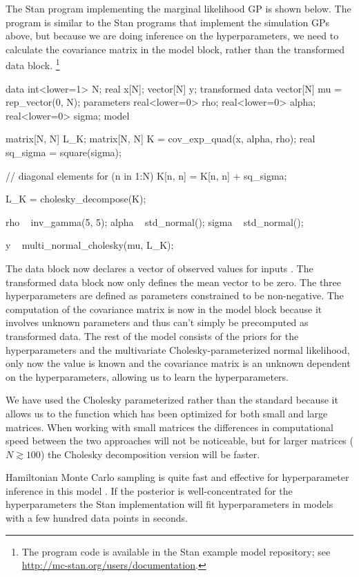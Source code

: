 The Stan program implementing the marginal likelihood GP is shown below. The
program is similar to the Stan programs that implement the simulation GPs
above, but because we are doing inference on the hyperparameters, we need to
calculate the covariance matrix  in the model block, rather than
the transformed data block.
%
\footnote{The program code is available in the Stan example model repository;
see \url{http://mc-stan.org/users/documentation}.}

%
\begin{stancode}
data {
  int<lower=1> N;
  real x[N];
  vector[N] y;
}
transformed data {
  vector[N] mu = rep_vector(0, N);
}
parameters {
  real<lower=0> rho;
  real<lower=0> alpha;
  real<lower=0> sigma;
}
model {
  matrix[N, N] L_K;
  matrix[N, N] K = cov_exp_quad(x, alpha, rho);
  real sq_sigma = square(sigma);

  // diagonal elements
  for (n in 1:N)
    K[n, n] = K[n, n] + sq_sigma;

  L_K = cholesky_decompose(K);

  rho ~ inv_gamma(5, 5);
  alpha ~ std_normal();
  sigma ~ std_normal();

  y ~ multi_normal_cholesky(mu, L_K);
}
\end{stancode}
%
The data block now declares a vector  of observed values 
for inputs .  The transformed data block now only defines the mean
vector to be zero.  The three hyperparameters are defined as parameters
constrained to be non-negative.  The computation of the covariance matrix
 is now in the model block because it involves unknown parameters and
thus can't simply be precomputed as transformed data.  The rest of the model
consists of the priors for the hyperparameters and the multivariate
Cholesky-parameterized normal likelihood, only now the value  is known
and the covariance matrix  is an unknown dependent on the
hyperparameters, allowing us to learn the hyperparameters.

We have used the Cholesky parameterized  rather than the
standard  because it allows us to the
 function which has been optimized for both small and
large matrices. When working with small matrices the differences in
computational speed between the two approaches will not be noticeable, but for
larger matrices ($N \gtrsim 100$) the Cholesky decomposition version will be
faster.

Hamiltonian Monte Carlo sampling is quite fast and effective for hyperparameter
inference in this model \citep{Neal:1997}. If the posterior is
well-concentrated for the hyperparameters the Stan implementation will fit
hyperparameters in models with a few hundred data points in seconds.

